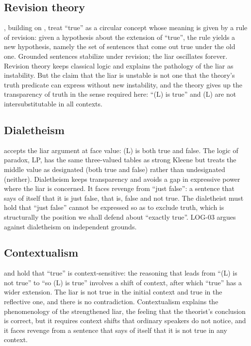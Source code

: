 \documentclass{situationist-preprint}
\begin{document}
\subsection{Revision theory}

\citet{GuptaBelnap1993}, building on \citet{Herzberger1982}, treat \enquote{true} as a circular concept whose meaning is given by a rule of revision: given a hypothesis about the extension of \enquote{true}, the rule yields a new hypothesis, namely the set of sentences that come out true under the old one. Grounded sentences stabilize under revision; the liar oscillates forever. Revision theory keeps classical logic and explains the pathology of the liar as instability. But the claim that the liar is unstable is not one that the theory's truth predicate can express without new instability, and the theory gives up the transparency of truth in the sense required here: \enquote{(L) is true} and (L) are not intersubstitutable in all contexts.

\subsection{Dialetheism}

\citet{Priest1979,Priest2006} accepts the liar argument at face value: (L) is both true and false. The logic of paradox, LP, has the same three-valued tables as strong Kleene but treats the middle value as designated (both true and false) rather than undesignated (neither). Dialetheism keeps transparency and avoids a gap in expressive power where the liar is concerned. It faces revenge from \enquote{just false}: a sentence that says of itself that it is just false, that is, false and not true. The dialetheist must hold that \enquote{just false} cannot be expressed so as to exclude truth, which is structurally the position we shall defend about \enquote{exactly true}. LOG-03 argues against dialetheism on independent grounds.

\subsection{Contextualism}

\citet{Burge1979} and \citet{Glanzberg2004} hold that \enquote{true} is context-sensitive: the reasoning that leads from \enquote{(L) is not true} to \enquote{so (L) is true} involves a shift of context, after which \enquote{true} has a wider extension. The liar is not true in the initial context and true in the reflective one, and there is no contradiction. Contextualism explains the phenomenology of the strengthened liar, the feeling that the theorist's conclusion is correct, but it requires context shifts that ordinary speakers do not notice, and it faces revenge from a sentence that says of itself that it is not true in any context.
\end{document}
